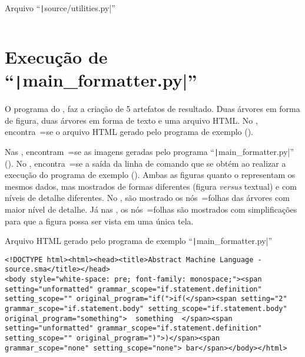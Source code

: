 \begin{code}
\caption{Arquivo ``\texttt|source/utilities.py|''}
\label{code:utilitiesPy}
\inputminted[firstline=39,firstnumber=1]{python3}{../source/utilities.py}
\end{code}


\chapter[main\_formatter.py]{Execução de ``\texttt|main_formatter.py|''}
\label{chapter:execucaoDeMainFormatter}

O programa do ,
faz a criação de 5 artefatos de resultado.
Duas árvores em forma de figura,
duas árvores em forma de texto e
uma arquivo HTML.
No ,
encontra~=se o arquivo HTML gerado pelo programa de exemplo ().

Nas ,
encontram~=se as imagens geradas pelo programa ``\texttt|main_formatter.py|'' ().
No ,
encontra~=se a saída da linha de comando que se obtém ao realizar a execução do programa de exemplo ().
Ambas as figuras  quanto o  representam os mesmos dados,
mas mostrados de formas diferentes (figura \textit{versus} textual) e
com níveis de detalhe diferentes.
No ,
são mostrado os nós~=folhas das árvores com maior nível de detalhe.
Já nas ,
os nós~=folhas são mostrados com simplificações para que a figura possa ser vista em uma única tela.
\begin{code}
\caption{Arquivo HTML gerado pelo programa de exemplo ``\texttt|main_formatter.py|''}
\label{code:MainFormatterHtml}
\begin{verbatim}
<!DOCTYPE html><html><head><title>Abstract Machine Language - source.sma</title></head>
<body style="white-space: pre; font-family: monospace;"><span setting="unformatted" grammar_scope="if.statement.definition" setting_scope="" original_program="if(">if(</span><span setting="2" grammar_scope="if.statement.body" setting_scope="if.statement.body" original_program="something">  something  </span><span setting="unformatted" grammar_scope="if.statement.definition" setting_scope="" original_program=")">)</span><span grammar_scope="none" setting_scope="none"> bar</span></body></html>
\end{verbatim}
\end{code}

